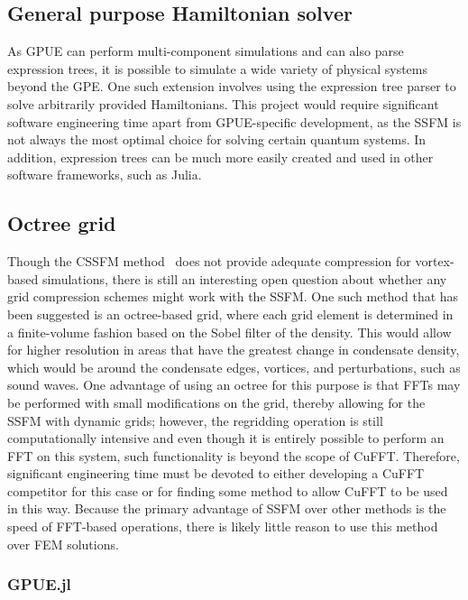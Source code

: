 \subsection{General purpose Hamiltonian solver}

As GPUE can perform multi-component simulations and can also parse expression trees, it is possible to simulate a wide variety of physical systems beyond the GPE.
One such extension involves using the expression tree parser to solve arbitrarily provided Hamiltonians.
This project would require significant software engineering time apart from GPUE-specific development, as the SSFM is not always the most optimal choice for solving certain quantum systems.
In addition, expression trees can be much more easily created and used in other software frameworks, such as Julia.

\subsection{Octree grid}

Though the CSSFM method~\cite{bayindir2015} does not provide adequate compression for vortex-based simulations, there is still an interesting open question about whether any grid compression schemes might work with the SSFM.
One such method that has been suggested is an octree-based grid, where each grid element is determined in a finite-volume fashion based on the Sobel filter of the density.
This would allow for higher resolution in areas that have the greatest change in condensate density, which would be around the condensate edges, vortices, and perturbations, such as sound waves.
One advantage of using an octree for this purpose is that FFTs may be performed with small modifications on the grid, thereby allowing for the SSFM with dynamic grids; however, the regridding operation is still computationally intensive and even though it is entirely possible to perform an FFT on this system, such functionality is beyond the scope of CuFFT.
Therefore, significant engineering time must be devoted to either developing a CuFFT competitor for this case or for finding some method to allow CuFFT to be used in this way.
Because the primary advantage of SSFM over other methods is the speed of FFT-based operations, there is likely little reason to use this method over FEM solutions.

\subsubsection{GPUE.jl}

